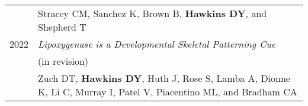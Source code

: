\documentclass[a4paper,10pt]{report}
\begin{document}
\begin{tabular}{rp{11cm}}
	              & \footnotesize Stracey CM, Sanchez K, Brown B, \textbf{Hawkins DY}, and Shepherd T                                                                             \\
	\textsc{2022} & \emph{Lipoxygenase is a Developmental Skeletal Patterning Cue}                                                                                                \\
	              & \small (in revision)                                                                                                                                          \\
	              & \footnotesize Zuch DT, \textbf{Hawkins DY}, Huth J, Rose S, Lamba A, Dionne K, Li C, Murray I, Patel V, Piacentino ML, and Bradham CA                         \\
\end{tabular}

\end{document}
